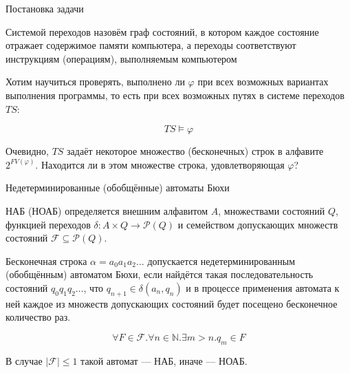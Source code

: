 \documentclass[aspectratio=169,dvipsnames,usenames]{beamer}
\begin{document}
\begin{frame}{Постановка задачи}
\begin{dfn}Системой переходов назовём граф состояний, в котором каждое состояние отражает
содержимое памяти компьютера, а переходы соответствуют инструкциям (операциям), выполняемым
компьютером\end{dfn}

Хотим научиться проверять, выполнено ли $\varphi$ при всех возможных вариантах выполнения программы,
то есть при всех возможных путях в системе переходов $TS$:

$$TS \models \varphi$$

Очевидно, $TS$ задаёт некоторое множество (бесконечных) строк в алфавите $2^{FV(\varphi)}$.
Находится ли в этом множестве строка, удовлетворяющая $\varphi$?
\end{frame}

\begin{frame}{Недетерминированные (обобщённые) автоматы Бюхи}
\begin{dfn}
НАБ (НОАБ) определяется внешним алфавитом $A$, множествами состояний $Q$, функцией переходов 
$\delta: A\times Q \rightarrow \mathcal{P}(Q)$ и семейством допускающих множеств состояний
$\mathcal{F} \subseteq \mathcal{P}(Q)$.

Бесконечная строка $\alpha = a_0a_1a_2\dots$ допускается недетерминированным (обобщённым) автоматом Бюхи, 
если найдётся такая последовательность состояний $q_0q_1q_2\dots$, что
$q_{n+1}\in\delta(a_n,q_n)$ и в процессе применения автомата к ней каждое из множеств допускающих 
состояний будет 
посещено бесконечное количество раз.


\vspace{-0.5cm}
$$\forall F\in\mathcal{F}.\forall n\in\mathbb{N}.\exists m > n.q_m\in F$$
\vspace{-0.5cm}

В случае $|\mathcal{F}| \le 1$ такой автомат --- НАБ, иначе --- НОАБ.
\end{dfn}
\end{frame}
\end{document}
